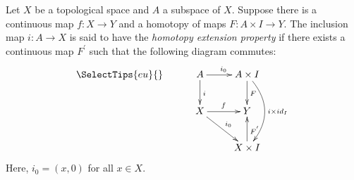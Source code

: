 \documentclass[12pt]{article}
\begin{document}
Let $X$ be a topological space and $A$ a subspace of $X$. Suppose there is a continuous map $f:X \to Y$ and a homotopy of maps $F: A \times I \to Y$. The inclusion map $i: A \to X$ is said to have the \emph{homotopy extension property} if there exists a continuous map $F^{'}$ such that the following diagram commutes:
$$
\SelectTips{eu}{}
\xymatrix{
& A \ar[d]^{i} \ar[r]^{i_{0}} & A \times I \ar[d]^{F} \ar@/^1.5pc/[dd]^{i \times id_{I}} \\
& X \ar[r]^{f} \ar[dr]^{i_{0}} & Y \\
& &  X \times I \ar[u]_{F^{'}} 
}
$$
Here, $i_0=(x,0)$ for all $ x \in X$.
\end{document}
